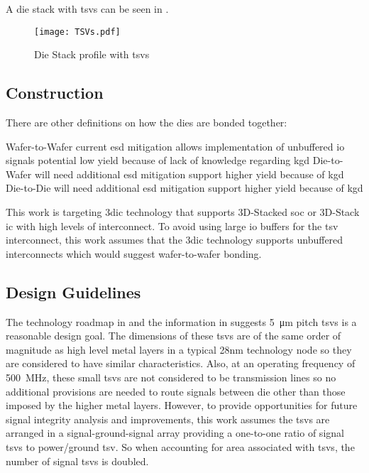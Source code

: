 A die stack with \acp{tsv} can be seen in .

\begin{figure}[h]
\centering
\captionsetup{justification=centering}
\captionsetup{width=.9\linewidth}
\centerline{
\mbox{\texttt{[image: TSVs.pdf]}}
}
\caption{Die Stack profile \cite{itrs2015_interconn} with \acp{tsv}}
\label{fig:tsv}
\end{figure}

\subsection{Construction}
\label{sec:3dic construction}

There are other definitions on how the dies are bonded together:
\begin{outline}
  \1 Wafer-to-Wafer
    \2 current \ac{esd} mitigation allows implementation of unbuffered \ac{io} signals
    \2 potential low yield because of lack of knowledge regarding \ac{kgd}
  \1 Die-to-Wafer
    \2 will need additional \ac{esd} mitigation support
    \2 higher yield because of \ac{kgd}
  \1 Die-to-Die
    \2 will need additional \ac{esd} mitigation support
    \2 higher yield because of \ac{kgd}
\end{outline}

This work is targeting \ac{3dic} technology that supports 3D-Stacked \ac{soc} or 3D-Stack \ac{ic} with high levels of interconnect.
To avoid using large \ac{io} buffers for the \ac{tsv} interconnect, this work assumes that the \ac{3dic} technology supports unbuffered interconnects which would suggest wafer-to-wafer bonding.
\iffalse because of the existing \ac{esd} mitigation during wafer handling although it is anticipated that improved \ac{esd} mitigation will be introduced in future manufacturing steps. \fi

\subsection{Design Guidelines}
\label{sec:3dic Design Guidelines}

The technology roadmap in \cite{itrs2015_interconn} and the information in \cite{patti2014} suggests \SI{5}{\micro\meter} pitch \acp{tsv} is a reasonable design goal. 
The dimensions of these \acp{tsv} are of the same order of magnitude as high level metal layers in a typical 28nm technology node so they are considered to have similar characteristics.
Also, at an operating frequency of \SI[per-mode=symbol]{500}{\mega \hertz}, these small \acp{tsv} are not considered to be transmission lines so no additional provisions are needed to route signals between die other than those imposed by the higher metal layers.
However, to provide opportunities for future signal integrity analysis and improvements, this work assumes the \acp{tsv} are arranged in a signal-ground-signal array providing a one-to-one ratio of signal \acp{tsv} to power/ground \ac{tsv}.
So when accounting for area associated with \acp{tsv}, the number of signal \acp{tsv} is doubled.

